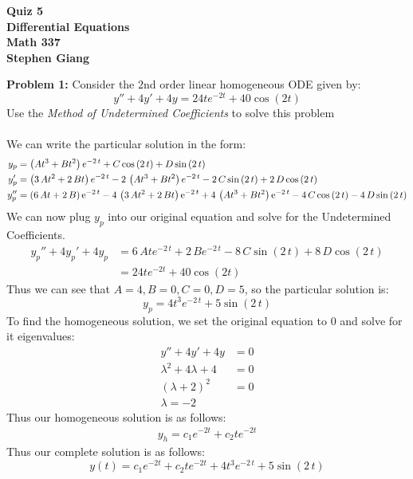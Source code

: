 \documentclass[12pt]{article}
\begin{document}
	
	\begin{center}
		\textbf{Quiz 5} \\
		\textbf{Differential Equations} \\
		\textbf{Math 337} \\
		\textbf{Stephen Giang} \\
	\end{center}

\noindent \textbf{Problem 1: }Consider the 2nd order linear homogeneous ODE given by:
	$$
	y'' + 4y' + 4y = 24te^{-2t} + 40\cos(2t)
	$$ 
Use the \textit{Method of Undetermined Coefficients} to solve this problem
\\ \\

\noindent We can write the particular solution in the form: 
	\begin{align*}
		y_p &=  \left( A{t}^{3}+B{t}^{2} \right) {{e}^{-2\,t}}+C\cos \left( 2\,t \right) +D\sin \left( 2\,t \right) 
		\\
		y_p' &=  \left( 3\,A{t}^{2}+2\,Bt \right) {{e}^{-2\,t}}-2\, \left( A{t}^{3}+B{t}^{2} \right) {{e}^{-2\,t}}-2\,C\sin \left( 2\,t \right) +2\,D\cos \left( 2\,t \right)
		\\
		y_p'' &=  \left( 6\,At+2\,B \right) {{\rm e}^{-2\,t}}-4\, \left( 3\,A{t}^{2}+2 \,Bt \right) {{\rm e}^{-2\,t}}+4\, \left( A{t}^{3}+B{t}^{2} \right) { {\rm e}^{-2\,t}}-4\,C\cos \left( 2\,t \right) -4\,D\sin \left( 2\,t \right)
	\end{align*}
We can now plug $y_p$ into our original equation and solve for the Undetermined Coefficients.
	\begin{align*}
		y_p'' + 4y_p' + 4y_p &= 6\,At{{e}^{-2\,t}}+2\,B{{e}^{-2\,t}}-8\,C\sin \left( 2\,t \right) +8\,D\cos \left( 2\,t \right) 
		\\ 
		&= 24te^{-2t} + 40\cos(2t)
	\end{align*}
Thus we can see that $A = 4, B = 0, C = 0, D = 5$, so the particular solution is:
	$$
	y_p = 4{t}^{3} {{e}^{-2\,t}}+ 5\sin \left( 2\,t \right)
	$$
To find the homogeneous solution, we set the original equation to 0 and solve for it eigenvalues:
	\begin{align*}
		y'' + 4y' + 4y &= 0 \\
		\lambda ^2 + 4\lambda + 4 &= 0 \\
		(\lambda + 2)^2 &= 0 \\
		\lambda = -2
	\end{align*}
Thus our homogeneous solution is as follows:
	\begin{align*}
		y_h = c_1e^{-2t} + c_2te^{-2t}
	\end{align*}
Thus our complete solution is as follows:
	$$
	y(t) = c_1e^{-2t} + c_2te^{-2t} + 4{t}^{3} {{e}^{-2\,t}}+ 5\sin \left( 2\,t \right)
	$$
\end{document}
